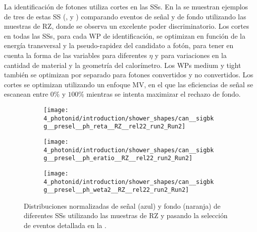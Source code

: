 La identificación de fotones utiliza cortes en las \acp{SS}. En la \Fig{\ref{fig:pid_ss:optimisation:shower_shapes}} se muestran ejemplos de tres de estas \ac{SS} (\reta, \eratio y \weta) comparando eventos de señal y de fondo utilizando las muestras de \ac{RZ}, donde se observa un excelente poder discriminatorio.
Los cortes en todas las \acp{SS}, para cada \ac{WP} de identificación, se optimizan en función de la energía transversal y la pseudo-rapidez del candidato a fotón, para tener en cuenta la forma de las variables para diferentes \(\eta\) y para variaciones en la cantidad de material y la geometría del calorímetro. Los \acp{WP} medium y tight también se optimizan por separado para fotones convertidos y no convertidos.
Los cortes se optimizan utilizando un enfoque \ac{MV}, en el que las eficiencias de señal se escanean entre \(0\%\) y \(100\%\) mientras se intenta maximizar el rechazo de fondo.

\begin{figure}[ht!]
    \centering
    \begin{subfigure}[h]{0.32\linewidth}
        \centering
        \texttt{[image: 4\_photonid/introduction/shower\_shapes/can\_\_sigbkg\_\_presel\_\_ph\_reta\_\_RZ\_\_rel22\_run2\_Run2]}
        \caption{\reta}
        \label{fig:pid_ss:optimisation:shower_shapes:reta}
    \end{subfigure}
    \hfill
    \begin{subfigure}[h]{0.32\linewidth}
        \centering
        \texttt{[image: 4\_photonid/introduction/shower\_shapes/can\_\_sigbkg\_\_presel\_\_ph\_eratio\_\_RZ\_\_rel22\_run2\_Run2]}
        \caption{\eratio}
        \label{fig:pid_ss:optimisation:shower_shapes:eratio}
    \end{subfigure}
    \hfill
    \begin{subfigure}[h]{0.32\linewidth}
        \centering
        \texttt{[image: 4\_photonid/introduction/shower\_shapes/can\_\_sigbkg\_\_presel\_\_ph\_weta2\_\_RZ\_\_rel22\_run2\_Run2]}
        \caption{\weta}
        \label{fig:pid_ss:optimisation:shower_shapes:weta2}
    \end{subfigure}
    \caption{Distribuciones normalizadas de se\~nal (azul) y fondo (naranja) de diferentes \acp{SS} utilizando las muestras de \ac{RZ} y pasando la selecci\'on de eventos detallada en la \Sect{\ref{subsec:pid_ss:pid:event_selection}}.}
    \label{fig:pid_ss:optimisation:shower_shapes}
\end{figure}



